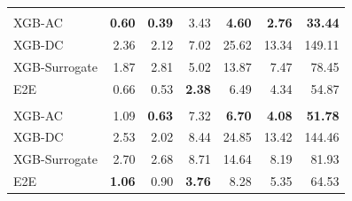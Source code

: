 \begin{longtable}{lrrrrrr}
\addlinespace[2pt]
\multicolumn{7}{@{}l}{\quad Horizon $H=6$} \\[2pt]
XGB-AC & \textbf{0.60} & \textbf{0.39} & 3.43 & \textbf{4.60} & \textbf{2.76} & \textbf{33.44} \\
XGB-DC & 2.36 & 2.12 & 7.02 & 25.62 & 13.34 & 149.11 \\
XGB-Surrogate & 1.87 & 2.81 & 5.02 & 13.87 & 7.47 & 78.45 \\
E2E & 0.66 & 0.53 & \textbf{2.38} & 6.49 & 4.34 & 54.87 \\
\addlinespace[2pt]
\multicolumn{7}{@{}l}{\quad Horizon $H=24$} \\[2pt]
XGB-AC & 1.09 & \textbf{0.63} & 7.32 & \textbf{6.70} & \textbf{4.08} & \textbf{51.78} \\
XGB-DC & 2.53 & 2.02 & 8.44 & 24.85 & 13.42 & 144.46 \\
XGB-Surrogate & 2.70 & 2.68 & 8.71 & 14.64 & 8.19 & 81.93 \\
E2E & \textbf{1.06} & 0.90 & \textbf{3.76} & 8.28 & 5.35 & 64.53 \\
\end{longtable}
\endgroup
